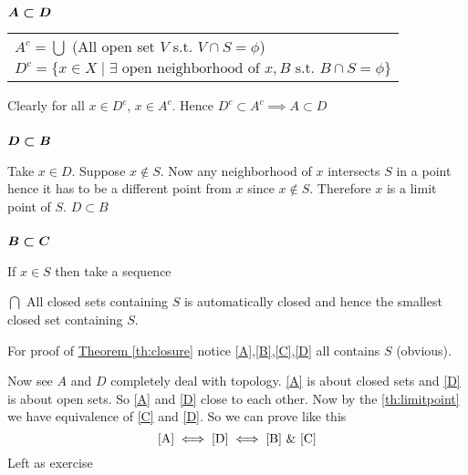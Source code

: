 \begin{myproof}
	\subsubsection*{$\boldsymbol{A\subset D}$}
		\begin{tabular}{l}\hspace{1.5cm}$A^c=\bigcup$ (All open set $V$ s.t. $V\cap S=\phi$) \\ \hspace{1.5cm}$D^c=\{x\in X\mid \exists \text{ open neighborhood of }x,B\text{ s.t. }B\cap S=\phi \}$\end{tabular}
		
		\setlength{\parindent}{0cm}Clearly for all $x\in D^c$, $x\in A^c$. Hence $D^c\subset A^c\implies A \subset D$\setlength{\parindent}{1cm}
		\subsubsection*{$\boldsymbol{D\subset B}$}
		Take $x\in D$. Suppose $x\notin S$. Now any neighborhood of $x$ intersects $S$ in a point hence it has to be a different point from $x$ since $x\notin S$. Therefore $x$ is a limit point of $S$. $D\subset B$
		\subsubsection*{$\boldsymbol{B\subset C}$}
		If $x\in S$ then take a sequence 
	
\end{myproof}

\sol $\bigcap$ All closed sets containing $S$ is automatically closed and hence the smallest closed set containing $S$.
\begin{myproof}
	For proof of \hyperref[th:closure]{Theorem \ref{th:closure}} notice \ref{A},\ref{B},\ref{C},\ref{D} all contains $S$ (obvious).
	
	Now see $A$ and $D$ completely deal with topology. \ref{A} is about closed sets and \ref{D} is about open sets. So \ref{A} and \ref{D} close to each other. Now by the \ref{th:limitpoint} we have equivalence of \ref{C} and \ref{D}. So we can prove like this
	$$\ref{A}\iff\ref{D}\iff\ref{B}\ \&\ \ref{C}$$Left as exercise
\end{myproof}
